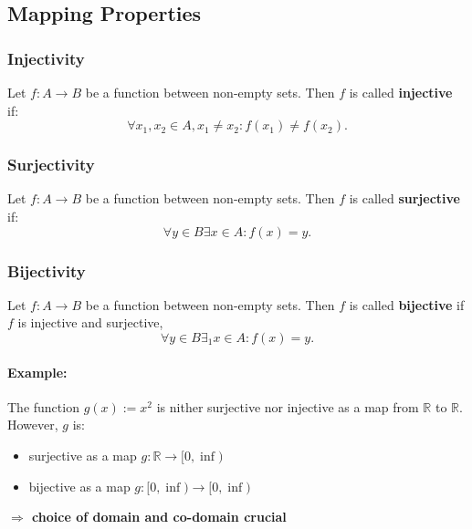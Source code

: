 \documentclass[twocolumn]{article}
\begin{document}
	\subsection{Mapping Properties}
		\subsubsection{Injectivity}
			Let $f:A\to B$ be a function between non-empty sets. 
			Then $f$ is called \textbf{injective} if:
			\[
			\forall x_1,x_2\in A,x_1 \not=x_2:f(x_1)\not=f(x_2)
			.\] 
		\subsubsection{Surjectivity}
			Let $f:A\to B$ be a function between non-empty sets. 
			Then $f$ is called \textbf{surjective} if:
			\[
			\forall y\in B\exists x\in A:f(x)=y
			.\] 
		\subsubsection{Bijectivity}
			Let $f:A\to B$ be a function between non-empty sets. 
			Then $f$ is called \textbf{bijective} if $f$ is injective and
			surjective,
			\[
			\forall y\in B\exists_1x\in A:f(x)=y
			.\] 
	
			\paragraph{Example:}
				The function $g(x):=x^2$ is nither surjective nor injective
				as a map from $\mathbb R $ to $\mathbb R $. However, $g$ is:
				\begin{itemize}%
				\renewcommand{\labelitemi}{$\rightarrow$}
				\item surjective as a map $g:\mathbb R \to[0,\inf)$
				\item bijective as a map $g:[0,\inf)\to[0,\inf)$ 
				\end{itemize}
				\textbf{$\Rightarrow$ choice of domain and co-domain crucial}
				
\end{document}
